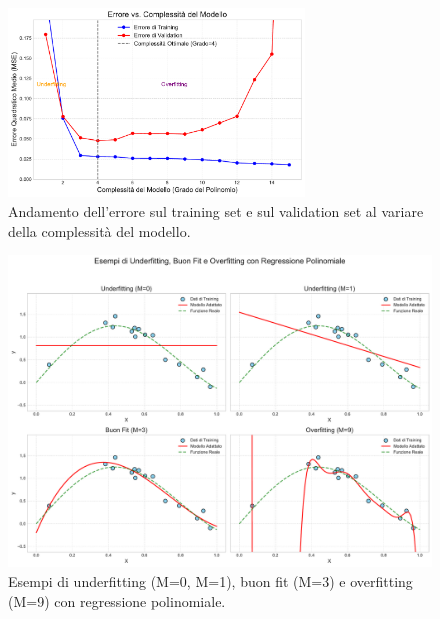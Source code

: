 \documentclass{article}
\begin{document}
\begin{figure}[H]
    \centering
    \includegraphics[width=0.7\textwidth]{images/error_vs_complexity.pdf}
    \caption{Andamento dell'errore sul training set e sul validation set al variare della complessità del modello.}
    \label{fig:error_vs_complexity}
\end{figure}

\begin{figure}[H]
    \centering
    \includegraphics[width=\textwidth]{images/under_over_fitting.pdf}
    \caption{Esempi di underfitting (M=0, M=1), buon fit (M=3) e overfitting (M=9) con regressione polinomiale.}
    \label{fig:under_over_fitting}
\end{figure}
\end{document}
